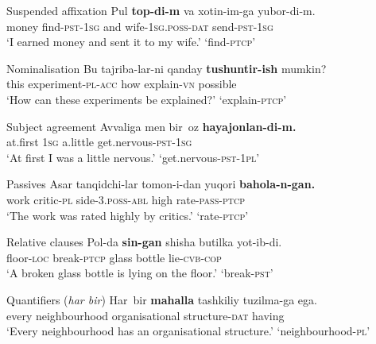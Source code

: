 \begin{exe}
\ex\label{ex:suspended_affixation} Suspended affixation
\gll Pul \textbf{top-di-m} va xotin-im-ga yubor-di-m.\\
money find-\textsc{pst}-\textsc{1sg} and wife-\textsc{1sg}.\textsc{poss}-\textsc{dat} send-\textsc{pst}-\textsc{1sg}\\
\glt `I earned money and sent it to my wife.' \hfill {} `find-\textsc{ptcp}'
\end{exe}
\begin{exe}
\ex\label{ex:nominalization} Nominalisation
\gll Bu tajriba-lar-ni qanday \textbf{tushuntir-ish} mumkin?\\
this experiment-\textsc{pl}-\textsc{acc} how explain-\textsc{vn} possible\\
\glt `How can these experiments be explained?' \hfill {} `explain-\textsc{ptcp}'
\end{exe}
\begin{exe}
\ex\label{ex:person_agreement} Subject agreement
\gll Avvaliga men bir~oz \textbf{hayajonlan-di-m.}\\
at.first \textsc{1sg} a.little get.nervous-\textsc{pst}-\textsc{1sg}\\
\glt `At first I was a little nervous.' \hfill {} `get.nervous-\textsc{pst}-\textsc{1pl}'
\end{exe}
\begin{exe}
\ex\label{ex:passives} Passives
\gll Asar tanqidchi-lar tomon-i-dan yuqori \textbf{bahola-n-gan.}\\
work critic-\textsc{pl} side-3.\textsc{poss}-\textsc{abl} high rate-\textsc{pass}-\textsc{ptcp}\\
\glt `The work was rated highly by critics.' \hfill {} `rate-\textsc{ptcp}'
\end{exe}
\begin{exe}
\ex\label{ex:relative_clauses} Relative clauses
\gll Pol-da \textbf{sin-gan} shisha butilka yot-ib-di.\\
floor-\textsc{loc} break-\textsc{ptcp} glass bottle lie-\textsc{cvb}-\textsc{cop}\\
\glt `A broken glass bottle is lying on the floor.' \hfill {} `break-\textsc{pst}'
\end{exe}
\begin{exe}
\ex\label{ex:quantifiers} Quantifiers (\textit{har bir})
\gll Har~bir \textbf{mahalla} tashkiliy tuzilma-ga ega.\\
every neighbourhood organisational structure-\textsc{dat} having\\
\glt `Every neighbourhood has an organisational structure.' \hfill {} `neighbourhood-\textsc{pl}'
\end{exe}
